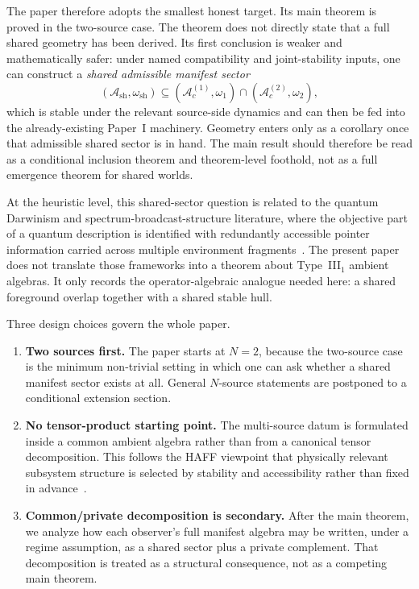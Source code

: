\documentclass[12pt]{article}
\theoremstyle{definition}
\theoremstyle{remark}
\begin{document}
The paper therefore adopts the smallest honest target. Its main theorem
is proved in the two-source case. The theorem does not directly state
that a full shared geometry has been derived. Its first conclusion is
weaker and mathematically safer: under named compatibility and
joint-stability inputs, one can construct a
\emph{shared admissible manifest sector}
\[
(\mathcal A_{\mathrm{sh}},\omega_{\mathrm{sh}})
\subseteq
(\mathcal A_c^{(1)},\omega_1)\cap(\mathcal A_c^{(2)},\omega_2),
\]
which is stable under the relevant source-side dynamics and can then be
fed into the already-existing Paper~I machinery. Geometry enters only as
a corollary once that admissible shared sector is in hand.
The main result should therefore be read as a conditional inclusion
theorem and theorem-level foothold, not as a full emergence theorem for
shared worlds.

At the heuristic level, this shared-sector question is related to the
quantum Darwinism and spectrum-broadcast-structure literature, where the
objective part of a quantum description is identified with redundantly
accessible pointer information carried across multiple environment
fragments~\cite{Zurek2003,Zurek2009,BrandaoPianiHorodecki2015,KorbiczHorodeckiHorodecki2014}.
The present paper does not translate those frameworks into a theorem
about Type~III\(_1\) ambient algebras. It only records the
operator-algebraic analogue needed here: a shared foreground overlap
together with a shared stable hull.

Three design choices govern the whole paper.
\begin{enumerate}
\item \textbf{Two sources first.} The paper starts at \(N=2\), because
  the two-source case is the minimum non-trivial setting in which one
  can ask whether a shared manifest sector exists at all. General
  \(N\)-source statements are postponed to a conditional extension
  section.
\item \textbf{No tensor-product starting point.} The multi-source datum
  is formulated inside a common ambient algebra rather than from a
  canonical tensor decomposition. This follows the HAFF viewpoint that
  physically relevant subsystem structure is selected by stability and
  accessibility rather than fixed in advance~\cite{HAFFA,HAFFD}.
\item \textbf{Common/private decomposition is secondary.} After the main
  theorem, we analyze how each observer's full manifest algebra may be
  written, under a regime assumption, as a shared sector plus a private
  complement. That decomposition is treated as a structural consequence,
  not as a competing main theorem.
\end{enumerate}
\end{document}
